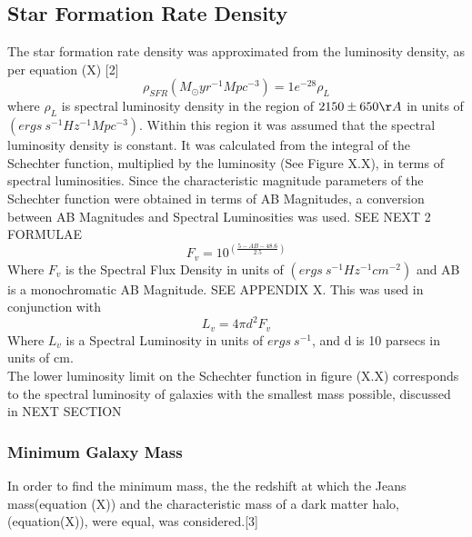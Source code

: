 \documentclass[pdf,color]{UoBnote}
\begin{document}

\subsection{Star Formation Rate Density}
The star formation rate density was approximated from the luminosity density, as per equation (X) [2]
\begin{equation}
\rho_{SFR}(M_\odot yr^{-1} Mpc^{-3})=1e^{-28} \rho_L 
\end{equation}
where $\rho_L$ is spectral luminosity density in the region of $2150\pm 650 \AA$ in units of $(ergs \ s^{-1} Hz^{-1} Mpc^{-3})$. Within this region it was assumed that the spectral luminosity density is constant. It was calculated from the integral of the Schechter function, multiplied by the luminosity (See Figure X.X), in terms of spectral luminosities. Since the characteristic magnitude parameters of the Schechter function were obtained in terms of AB Magnitudes, a conversion between AB Magnitudes and Spectral Luminosities was used. SEE NEXT 2 FORMULAE
\begin{equation}
F_v = 10^{\displaystyle\left (\frac{5-AB-48.6}{2.5}\right )} 
\end{equation}
Where $F_v$ is the Spectral Flux Density in units of $(ergs \ s^{-1} Hz^{-1} cm^{-2})$ and AB is a monochromatic AB Magnitude. SEE APPENDIX X. This was used in conjunction with
\begin{equation}
L_v=4\pi d^2 F_v
\end{equation} 
Where $L_v$ is a Spectral Luminosity in units of $ergs \ s^{-1}$, and d is 10 parsecs in units of cm. \\
\newline
The lower luminosity limit on the Schechter function in figure (X.X) corresponds to the spectral luminosity of galaxies with the smallest mass possible, discussed in NEXT SECTION
\subsubsection{Minimum Galaxy Mass}
In order to find the minimum mass, the the redshift at which the Jeans mass(equation (X)) and the characteristic mass of a dark matter halo, (equation(X)), were equal, was considered.[3]
\end{document}
